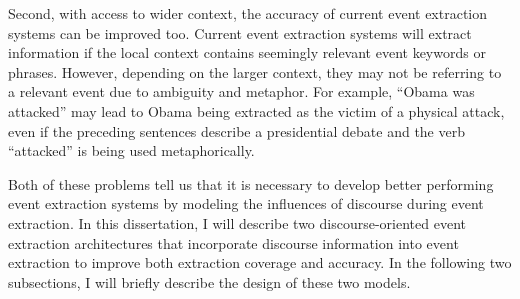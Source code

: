 Second, with access to wider context, the accuracy of current event extraction systems can be improved too.
Current event extraction systems will extract information 
if the local context 
contains seemingly relevant event keywords or phrases. 
However, depending on the larger context, they may not be 
referring to a relevant event due to ambiguity and metaphor. 
For example, 
``Obama was attacked'' may lead to
Obama being extracted as the victim of a physical attack,
even if the preceding sentences describe a presidential debate
and the verb ``attacked'' is being used metaphorically.

Both of these problems tell us that it is necessary to 
develop better performing event extraction systems by modeling the influences of discourse during event extraction. 
In this dissertation, I will describe two discourse-oriented event extraction architectures that 
incorporate discourse information into event extraction to improve both extraction coverage and accuracy.
In the following two subsections, I will briefly describe the design of these two models.
